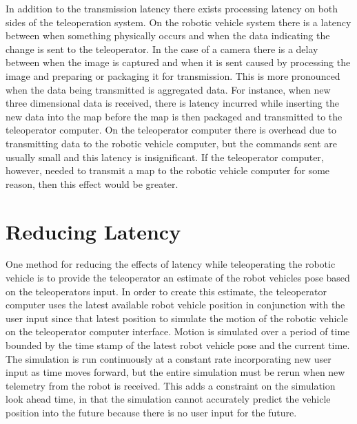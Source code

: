 \documentclass[12pt]{report}
\begin{document}
In addition to the transmission latency there exists processing latency on both sides of the teleoperation system.  On the robotic vehicle system there is a latency between when something physically occurs and when the data indicating the change is sent to the teleoperator.  In the case of a camera there is a delay between when the image is captured and when it is sent caused by processing the image and preparing or packaging it for transmission.  This is more pronounced when the data being transmitted is aggregated data.  For instance, when new three dimensional data is received, there is latency incurred while inserting the new data into the map before the map is then packaged and transmitted to the teleoperator computer.  On the teleoperator computer there is overhead due to transmitting data to the robotic vehicle computer, but the commands sent are usually small and this latency is insignificant.  If the teleoperator computer, however, needed to transmit a map to the robotic vehicle computer for some reason, then this effect would be greater.

\section{Reducing Latency}
One method for reducing the effects of latency while teleoperating the robotic vehicle is to provide the teleoperator an estimate of the robot vehicles pose based on the teleoperators input.  In order to create this estimate, the teleoperator computer uses the latest available robot vehicle position in conjunction with the user input since that latest position to simulate the motion of the robotic vehicle on the teleoperator computer interface.  Motion is simulated over a period of time bounded by the time stamp of the latest robot vehicle pose and the current time.  The simulation is run continuously at a constant rate incorporating new user input as time moves forward, but the entire simulation must be rerun when new telemetry from the robot is received.  This adds a constraint on the simulation look ahead time, in that the simulation cannot accurately predict the vehicle position into the future because there is no user input for the future.
\end{document}
